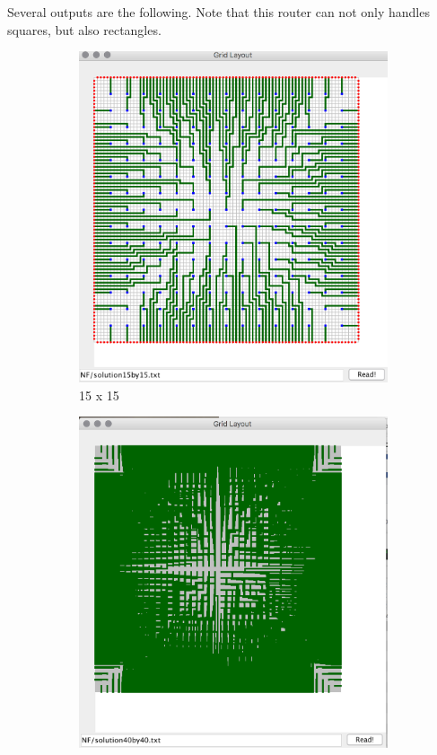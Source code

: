 \documentclass{article}
\begin{document}
\begin{spacing}{1.1}
    Several outputs are the following. Note that this router can not only handles squares, but also rectangles.
    \begin{figure}[H]
        \centering
        \begin{subfigure}{0.3\textwidth}
            \includegraphics[width = \textwidth]{NF1.png}
            \caption{15 x 15}
        \end{subfigure}
        \begin{subfigure}{0.3\textwidth}
            \includegraphics[width = \textwidth]{NF2.png}

\end{subfigure}
\end{figure}
\end{spacing}
\end{document}
